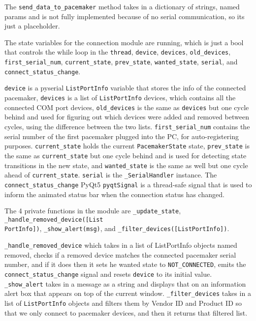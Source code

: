 \documentclass[12pt]{article}
\begin{document}
The \verb|send_data_to_pacemaker| method takes in a dictionary of strings, named params and is not fully implemented because of no serial communication, so its just a placeholder.

The state variables for the connection module are running, which is just a bool that controls the while loop in the \verb|thread|, \verb|device|, \verb|devices|, \verb|old_devices|, \verb|first_serial_num|, \verb|current_state|, \verb|prev_state|, \verb|wanted_state|, \verb|serial|, and \verb|connect_status_change|.

\verb|device| is a pyserial \verb|ListPortInfo| variable that stores the info of the connected pacemaker, \verb|devices| is a list of \verb|ListPortInfo| devices, which contains all the connected COM port devices, \verb|old_devices| is the same as \verb|devices| but one cycle behind and used for figuring out which devices were added and removed between cycles, using the difference between the two lists. \verb|first_serial_num| contains the serial number of the first pacemaker plugged into the PC, for auto-registering purposes. \verb|current_state| holds the current \verb|PacemakerState| state, \verb|prev_state| is the same as \verb|current_state| but one cycle behind and is used for detecting state transitions in the new state, and \verb|wanted_state| is the same as well but one cycle ahead of \verb|current_state|. \verb|serial| is the \verb|_SerialHandler| instance. The \verb|connect_status_change| PyQt5 \verb|pyqtSignal| is a thread-safe signal that is used to inform the animated status bar when the connection status has changed. 

The 4 private functions in the module are \verb|_update_state|, \verb|_handle_removed_device([List|\\\verb|PortInfo])|, \verb|_show_alert(msg)|, and \verb|_filter_devices([ListPortInfo])|. 

\verb|_handle_removed_device| which takes in a list of ListPortInfo objects named removed, checks if a removed device matches the connected pacemaker serial number, and if it does then it sets he wanted state to \verb|NOT_CONNECTED|, emits the \verb|connect_status_change| signal and resets \verb|device| to its initial value. \verb|_show_alert| takes in a message as a string and displays that on an information alert box that appears on top of the current window. \verb|_filter_devices| takes in a list of \verb|ListPortInfo| objects and filters them by Vendor ID and Product ID so that we only connect to pacemaker devices, and then it returns that filtered list.
\end{document}
